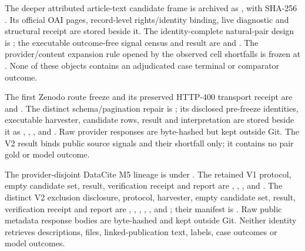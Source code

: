 The deeper attributed article-text candidate frame is archived as
,
with SHA-256
.
Its official OAI pages, record-level rights/identity binding, live diagnostic
and structural receipt are stored beside it.  The identity-complete natural-pair
design is
;
the executable outcome-free signal census and result are
and .  The provider/content
expansion rule opened by the observed cell shortfalls is frozen at
.  None of these
objects contains an adjudicated case terminal or comparator outcome.

The first Zenodo route freeze and its preserved HTTP-400 transport receipt are
and
.
The distinct schema/pagination repair is
; its disclosed pre-freeze
identities, executable harvester, candidate rows, result and interpretation are
stored beside it as
,
,
,
 and
.  Raw provider responses are
byte-hashed but kept outside Git.  The V2 result binds public source signals and
their shortfall only; it contains no pair gold or model outcome.

The provider-disjoint DataCite M5 lineage is under
. The retained V1
protocol, empty candidate set, result, verification receipt and report are
,
,
,
 and . The distinct
V2 exclusion disclosure, protocol, harvester, empty candidate set, result,
verification receipt and report are
,
,
,
,
,
 and ; their
manifest is . Raw public metadata response bodies are
byte-hashed and kept outside Git. Neither identity retrieves descriptions,
files, linked-publication text, labels, case outcomes or model outcomes.

